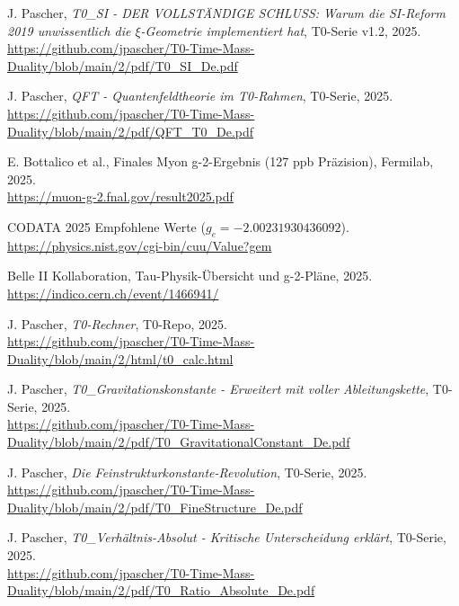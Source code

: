\documentclass[12pt,a4paper]{article}
\theoremstyle{definition}
\begin{document}
	
	\begin{thebibliography}{99}
		 J. Pascher, \textit{T0\_SI - DER VOLLSTÄNDIGE SCHLUSS: Warum die SI-Reform 2019 unwissentlich die $\xi$-Geometrie implementiert hat}, T0-Serie v1.2, 2025. \\
		\url{https://github.com/jpascher/T0-Time-Mass-Duality/blob/main/2/pdf/T0_SI_De.pdf}
		
		 J. Pascher, \textit{QFT - Quantenfeldtheorie im T0-Rahmen}, T0-Serie, 2025. \\
		\url{https://github.com/jpascher/T0-Time-Mass-Duality/blob/main/2/pdf/QFT_T0_De.pdf}
		
		 E. Bottalico et al., Finales Myon g-2-Ergebnis (127 ppb Präzision), Fermilab, 2025. \\
		\url{https://muon-g-2.fnal.gov/result2025.pdf}
		
		 CODATA 2025 Empfohlene Werte ($g_e = -2.00231930436092$). \\
		\url{https://physics.nist.gov/cgi-bin/cuu/Value?gem}
		
		 Belle II Kollaboration, Tau-Physik-Übersicht und g-2-Pläne, 2025. \\
		\url{https://indico.cern.ch/event/1466941/}
		
		 J. Pascher, \textit{T0-Rechner}, T0-Repo, 2025. \\
		\url{https://github.com/jpascher/T0-Time-Mass-Duality/blob/main/2/html/t0_calc.html}
		
		 J. Pascher, \textit{T0\_Gravitationskonstante - Erweitert mit voller Ableitungskette}, T0-Serie, 2025. \\
		\url{https://github.com/jpascher/T0-Time-Mass-Duality/blob/main/2/pdf/T0_GravitationalConstant_De.pdf}
		
		 J. Pascher, \textit{Die Feinstrukturkonstante-Revolution}, T0-Serie, 2025. \\
		\url{https://github.com/jpascher/T0-Time-Mass-Duality/blob/main/2/pdf/T0_FineStructure_De.pdf}
		
		 J. Pascher, \textit{T0\_Verhältnis-Absolut - Kritische Unterscheidung erklärt}, T0-Serie, 2025. \\
		\url{https://github.com/jpascher/T0-Time-Mass-Duality/blob/main/2/pdf/T0_Ratio_Absolute_De.pdf}
		

\end{thebibliography}
\end{document}
